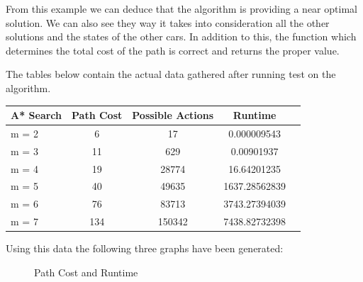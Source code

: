 \documentclass{article}
\begin{document}
From this example we can deduce that the algorithm is providing a near optimal solution. We can also see they way it takes into consideration all the other solutions and the states of the other cars. In addition to this, the function which determines the total cost of the path is correct and returns the proper value.

The tables below contain the actual data gathered after running test on the algorithm.

\bigskip

\begin{center}
    \begin{tabular}{l*{3}{c}r}
 A* Search &  Path Cost & Possible Actions & Runtime\\
\hline
m = 2   & 6 & 17 & 0.000009543   \\
m = 3   & 11 & 629 & 0.00901937   \\
m = 4   & 19 & 28774 & 16.64201235  \\
m = 5   & 40 & 49635 & 1637.28562839  \\
m = 6   & 76 & 83713 & 3743.27394039   \\
m = 7   & 134 & 150342 & 7438.82732398 \\
\end{tabular}
\end{center}

\bigskip

Using this data the following three graphs have been generated:

\begin{figure}[H]
    \centering
    \begin{multicols}{2}
        \centering
    \end{multicols}
    \caption{Path Cost and Runtime}
\end{figure}
\end{document}
